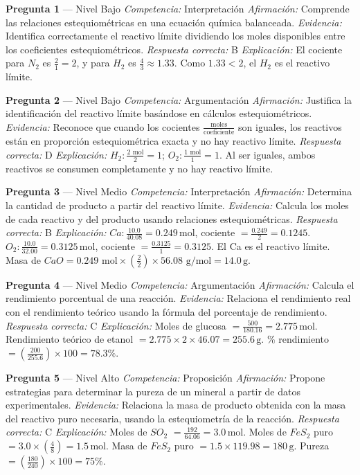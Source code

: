 \documentclass[
  spanish,
  letterpaper,
  12pt,
  oneside,
  open=any]{scrbook}
\begin{document}
\textbf{Pregunta 1} --- Nivel Bajo \emph{Competencia:} Interpretación
\emph{Afirmación:} Comprende las relaciones estequiométricas en una
ecuación química balanceada. \emph{Evidencia:} Identifica correctamente
el reactivo límite dividiendo los moles disponibles entre los
coeficientes estequiométricos. \emph{Respuesta correcta:} B
\emph{Explicación:} El cociente para \(N_2\) es \(\frac{2}{1} = 2\), y
para \(H_2\) es \(\frac{4}{3} \approx 1.33\). Como \(1.33 < 2\), el
\(H_2\) es el reactivo límite.

\textbf{Pregunta 2} --- Nivel Bajo \emph{Competencia:} Argumentación
\emph{Afirmación:} Justifica la identificación del reactivo límite
basándose en cálculos estequiométricos. \emph{Evidencia:} Reconoce que
cuando los cocientes \(\frac{\text{moles}}{\text{coeficiente}}\) son
iguales, los reactivos están en proporción estequiométrica exacta y no
hay reactivo límite. \emph{Respuesta correcta:} D \emph{Explicación:}
\(H_2: \frac{2 \text{ mol}}{2} = 1\);
\(O_2: \frac{1 \text{ mol}}{1} = 1\). Al ser iguales, ambos reactivos se
consumen completamente y no hay reactivo límite.

\textbf{Pregunta 3} --- Nivel Medio \emph{Competencia:} Interpretación
\emph{Afirmación:} Determina la cantidad de producto a partir del
reactivo límite. \emph{Evidencia:} Calcula los moles de cada reactivo y
del producto usando relaciones estequiométricas. \emph{Respuesta
correcta:} B \emph{Explicación:}
\(Ca: \frac{10.0}{40.08} = 0.249\,\text{mol}\), cociente
\(= \frac{0.249}{2} = 0.1245\).
\(O_2: \frac{10.0}{32.00} = 0.3125\,\text{mol}\), cociente
\(= \frac{0.3125}{1} = 0.3125\). El Ca es el reactivo límite. Masa de
\(CaO = 0.249 \text{ mol} \times (\frac{2}{2}) \times 56.08 \text{ g/mol} = 14.0\,\text{g}\).

\textbf{Pregunta 4} --- Nivel Medio \emph{Competencia:} Argumentación
\emph{Afirmación:} Calcula el rendimiento porcentual de una reacción.
\emph{Evidencia:} Relaciona el rendimiento real con el rendimiento
teórico usando la fórmula del porcentaje de rendimiento. \emph{Respuesta
correcta:} C \emph{Explicación:} Moles de glucosa
\(= \frac{500}{180.16} = 2.775\,\text{mol}\). Rendimiento teórico de
etanol \(= 2.775 \times 2 \times 46.07 = 255.6\,\text{g}\). \(\%\)
rendimiento \(= (\frac{200}{255.6}) \times 100 = 78.3\%\).

\textbf{Pregunta 5} --- Nivel Alto \emph{Competencia:} Proposición
\emph{Afirmación:} Propone estrategias para determinar la pureza de un
mineral a partir de datos experimentales. \emph{Evidencia:} Relaciona la
masa de producto obtenida con la masa del reactivo puro necesaria,
usando la estequiometría de la reacción. \emph{Respuesta correcta:} C
\emph{Explicación:} Moles de \(SO_2\)
\(= \frac{192}{64.06} = 3.0\,\text{mol}\). Moles de \(FeS_2\) puro
\(= 3.0 \times (\frac{4}{8}) = 1.5\,\text{mol}\). Masa de \(FeS_2\) puro
\(= 1.5 \times 119.98 = 180\,\text{g}\). Pureza
\(= (\frac{180}{240}) \times 100 = 75\%\).
\end{document}
